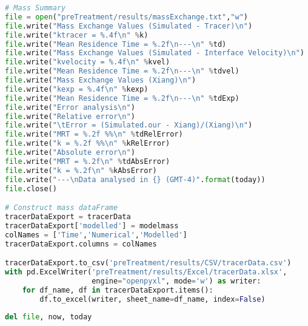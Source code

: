 \begin{lstlisting}[language=python]
# Mass Summary
file = open("preTreatment/results/massExchange.txt","w")
file.write("Mass Exchange Values (Simulated - Tracer)\n")
file.write("ktracer = %.4f\n" %k)
file.write("Mean Residence Time = %.2f\n---\n" %td)
file.write("Mass Exchange Values (Simulated - Interface Velocity)\n")
file.write("kvelocity = %.4f\n" %kvel)
file.write("Mean Residence Time = %.2f\n---\n" %tdvel)
file.write("Mass Exchange Values (Xiang)\n")
file.write("kexp = %.4f\n" %kexp)
file.write("Mean Residence Time = %.2f\n---\n" %tdExp)
file.write("Error analysis\n")
file.write("Relative error\n")
file.write("\tError = (Simulated.our - Xiang)/(Xiang)\n")
file.write("MRT = %.2f %%\n" %tdRelError)
file.write("k = %.2f %%\n" %kRelError)
file.write("Absolute error\n")
file.write("MRT = %.2f\n" %tdAbsError)
file.write("k = %.2f\n" %kAbsError)
file.write("---\nData analysed in {} (GMT-4)".format(today))
file.close()

# Construct mass dataFrame
tracerDataExport = tracerData
tracerDataExport['modelled'] = modelmass
colNames = ['Time','Numerical','Modelled']
tracerDataExport.columns = colNames

tracerDataExport.to_csv('preTreatment/results/CSV/tracerData.csv')
with pd.ExcelWriter('preTreatment/results/Excel/tracerData.xlsx',
                    engine="openpyxl", mode='w') as writer:
    for df_name, df in tracerDataExport.items():
        df.to_excel(writer, sheet_name=df_name, index=False)
        
del file, now, today

\end{lstlisting}
